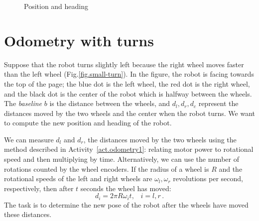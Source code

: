 \begin{figure}
\begin{center}
\caption{Position and heading}\label{fig.pos-head}
\end{center}
\end{figure}

\section{Odometry with turns}\label{s.odometry-turns}

Suppose that the robot turns slightly left because the right wheel moves faster than the left wheel (Fig.\ref{fig.small-turn}). In the figure, the robot is facing towards the top of the page; the blue dot is the left wheel, the red dot is the right wheel, and the black dot is the center of the robot which is halfway between the wheels. The \textit{baseline} $b$ is the distance between the wheels, and $d_l, d_r, d_c$ represent the distances moved by the two wheels and the center when the robot turns. We want to compute the new position and heading of the robot.

We can measure $d_l$ and $d_r$, the distances moved by the two wheels using the method described in Activity~\ref{act.odometry1}: relating motor power to rotational speed and then multiplying by time. Alternatively, we can use the number of rotations counted by the wheel encoders. If the radius of a wheel is $R$ and the rotational speeds of the left and right wheels are $\omega_l,\omega_r$ revolutions per second, respectively, then after $t$ seconds the wheel has moved:
\begin{equation}
d_i=2\pi R \omega_i t,\;\;\; i=l,r\,. \label{eq.rotation}
\end{equation}
The task is to determine the new pose of the robot after the wheels have moved these distances.

